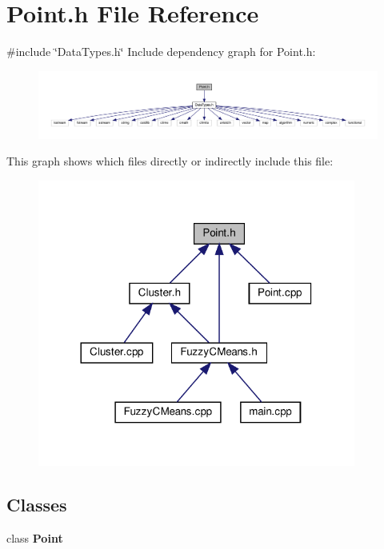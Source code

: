 \section{Point.\+h File Reference}
\label{_point_8h}
{\ttfamily \#include \char`\"{}Data\+Types.\+h\char`\"{}}\newline
Include dependency graph for Point.\+h\+:
\nopagebreak
\begin{figure}[H]
\begin{center}
\leavevmode
\includegraphics[width=350pt]{_point_8h__incl}
\end{center}
\end{figure}
This graph shows which files directly or indirectly include this file\+:
\nopagebreak
\begin{figure}[H]
\begin{center}
\leavevmode
\includegraphics[width=296pt]{_point_8h__dep__incl}
\end{center}
\end{figure}
\subsection*{Classes}
\begin{DoxyCompactItemize}
\item 
class \textbf{ Point}
\end{DoxyCompactItemize}
